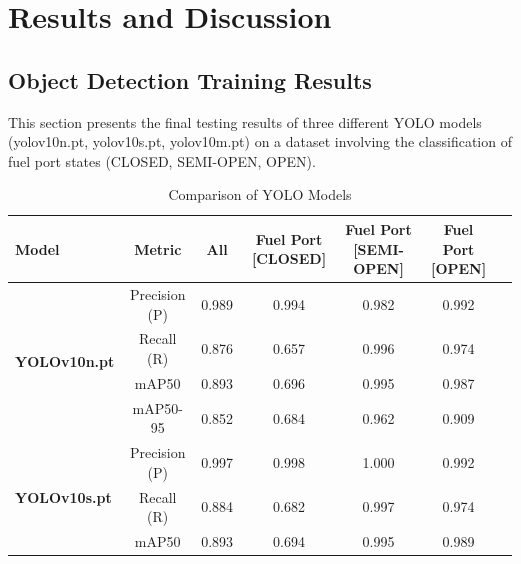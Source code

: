 \documentclass[12pt,oneside]{book} %
\begin{document}
\chapter{Results and Discussion}

\section{Object Detection Training Results}

This section presents the final testing results of three different YOLO models
(yolov10n.pt, yolov10s.pt, yolov10m.pt) on a dataset involving the
classification of fuel port states (CLOSED, SEMI-OPEN, OPEN).

\begin{table}[h!]
    \centering
    \caption{Comparison of YOLO Models}
    \begin{adjustbox}{max width=\textwidth}
        \begin{tabular}{lcccccc}
            \toprule
            \textbf{Model}                        & \textbf{Metric} & \textbf{All} & \textbf{Fuel Port [CLOSED]} & \textbf{Fuel Port [SEMI-OPEN]} & \textbf{Fuel Port [OPEN]} \\
            \midrule
            \multirow{4}{*}{\textbf{YOLOv10n.pt}} & Precision (P)   & 0.989        & 0.994                       & 0.982                          & 0.992                     \\
                                                  & Recall (R)      & 0.876        & 0.657                       & 0.996                          & 0.974                     \\
                                                  & mAP50           & 0.893        & 0.696                       & 0.995                          & 0.987                     \\
                                                  & mAP50-95        & 0.852        & 0.684                       & 0.962                          & 0.909                     \\
            \midrule
            \multirow{4}{*}{\textbf{YOLOv10s.pt}} & Precision (P)   & 0.997        & 0.998                       & 1.000                          & 0.992                     \\
                                                  & Recall (R)      & 0.884        & 0.682                       & 0.997                          & 0.974                     \\
                                                  & mAP50           & 0.893        & 0.694                       & 0.995                          & 0.989                     \\

\end{tabular}
\end{adjustbox}
\end{table}
\end{document}
